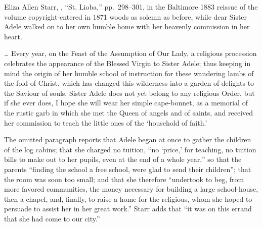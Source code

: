 \begin{witnesstext}{Eliza Allen Starr, , ``St.
Lioba,'' pp.~298--301, in the Baltimore 1883 reissue of the volume
copyright-entered in 1871}
woods as solemn as before, while dear Sister Adele walked on to her own
humble home with her heavenly commission in her heart.\par
\dots{} Every year, on the Feast of the Assumption of Our Lady, a
religious procession celebrates the appearance of the Blessed Virgin to
Sister Adele; thus keeping in mind the origin of her humble school of
instruction for these wandering lambs of the fold of Christ, which has
changed this wilderness into a garden of delights to the Saviour of
souls. Sister Adele does not yet belong to any religious Order, but if
she ever does, I hope she will wear her simple cape-bonnet, as a
memorial of the rustic garb in which she met the Queen of angels and of
saints, and received her commission to teach the little ones of the
`household of faith.'
\end{witnesstext}

The omitted paragraph reports that Adele began at once to gather the
children of the log cabins; that she charged no tuition, ``no `price,'
for teaching, no tuition bills to make out to her pupils, even at the
end of a whole year,'' so that the parents ``finding the school a free
school, were glad to send their children''; that the room was soon too
small; and that she therefore ``undertook to beg, from more favored
communities, the money necessary for building a large school-house,
then a chapel, and, finally, to raise a home for the religious, whom
she hoped to persuade to assist her in her great work.'' Starr adds
that ``it was on this errand that she had come to our city.''

